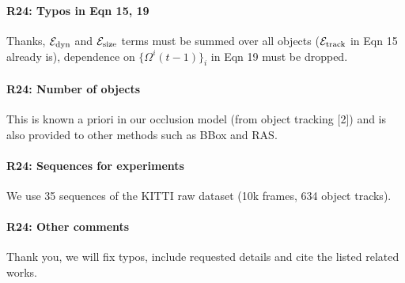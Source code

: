 \documentclass[10pt,twocolumn,letterpaper]{article}
\begin{document}
\vspace{-0.4cm}
\paragraph{R24: Typos in Eqn 15, 19}
Thanks, ${\mathcal{E}}_{\textrm{dyn}}$ and ${\mathcal{E}}_{\textrm{size}}$ terms must be summed over all objects (${\mathcal{E}}_{\textrm{track}}$ in Eqn 15 already is), dependence on $\{ \Omega^i (t-1) \}_i$ in Eqn 19 must be dropped.


\vspace{-0.4cm}
\paragraph{R24: Number of objects} 
This is known a priori in our occlusion model (from object tracking [2]) and is also provided to other methods such as BBox and RAS.


\vspace{-0.4cm}
\paragraph{R24: Sequences for experiments} 
We use 35 sequences of the KITTI raw dataset (10k frames, 634 object tracks).

\vspace{-0.4cm}
\paragraph{R24: Other comments}
Thank you, we will fix typos, include requested details and cite the listed related works.
\end{document}
